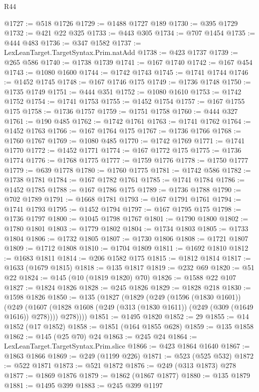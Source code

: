 \begin{lexlean}{R44}
\begin{coremodule}
@1727 := @518 @1726
@1729 := @1488 @1727 @189
@1730 := @395 @1729
@1732 := @421 @22 @325
@1733 := @443 @305
@1734 := @707 @1454
@1735 := @444 @483
@1736 := @347 @1582
@1737 := LexLeanTarget.TargetSyntax.Prim.natAdd
@1738 := @423 @1737
@1739 := @265 @586
@1740 := @1738 @1739
@1741 := @167 @1740
@1742 := @167 @454
@1743 := @1080 @1600
@1744 := @1742 @1743
@1745 := @1741 @1744
@1746 := @1452 @1745
@1748 := @167 @1746 @175
@1749 := @1736 @1748
@1750 := @1735 @1749
@1751 := @444 @351
@1752 := @1080 @1610
@1753 := @1742 @1752
@1754 := @1741 @1753
@1755 := @1452 @1754
@1757 := @167 @1755 @175
@1758 := @1736 @1757
@1759 := @1751 @1758
@1760 := @444 @327
@1761 := @190 @485
@1762 := @1742 @1761
@1763 := @1741 @1762
@1764 := @1452 @1763
@1766 := @167 @1764 @175
@1767 := @1736 @1766
@1768 := @1760 @1767
@1769 := @1080 @485
@1770 := @1742 @1769
@1771 := @1741 @1770
@1772 := @1452 @1771
@1774 := @167 @1772 @175
@1775 := @1736 @1774
@1776 := @1768 @1775
@1777 := @1759 @1776
@1778 := @1750 @1777
@1779 := @639 @1778
@1780 := @1760 @1775
@1781 := @1742 @586
@1782 := @1738 @1781
@1784 := @167 @1782 @1761
@1785 := @1741 @1784
@1786 := @1452 @1785
@1788 := @167 @1786 @175
@1789 := @1736 @1788
@1790 := @702 @1789
@1791 := @1668 @1781
@1793 := @167 @1791 @1761
@1794 := @1741 @1793
@1795 := @1452 @1794
@1797 := @167 @1795 @175
@1798 := @1736 @1797
@1800 := @1045 @1798 @1767
@1801 := @1790 @1800
@1802 := @1780 @1801
@1803 := @1779 @1802
@1804 := @1734 @1803
@1805 := @1733 @1804
@1806 := @1732 @1805
@1807 := @1730 @1806
@1808 := @1721 @1807
@1809 := @1712 @1808
@1810 := @1704 @1809
@1811 := @1692 @1810
@1812 := @1683 @1811
@1814 := @206 @1582 @175
@1815 := @1812 @1814
@1817 := @1633 (@1679 @1815)
@1818 := @135 @1817
@1819 := @232 @69
@1820 := @51 @22
@1824 := @145 (@10 (@1819 @1820) @70)
@1826 := @1588 @22 @107
@1827 := @1824 @1826
@1828 := @245 @1826
@1829 := @1828 @218
@1830 := @1598 @1826
@1850 := @135
    (@1827
      (@1829
        (@249
          (@1596 (@1830 @1601))
          (@249
            (@1607 (@1828 @1608 (@249 (@313 (@1830 @1611)) (@249 (@309 (@1649 @1616)) @278))))
            @278))))
@1851 := @1495 @1820
@1852 := 29
@1855 := @14 @1852 (@17 @1852)
@1858 := @1851 (@164 @1855 @628)
@1859 := @135 @1858
@1862 := @145 (@25 @70) @24
@1863 := @245 @24
@1864 := LexLeanTarget.TargetSyntax.Prim.slice
@1866 := @423 @1864 @1640
@1867 := @1863 @1866
@1869 := @249 (@1199 @226)
@1871 := @523 (@525 @532)
@1872 := @522 @1871
@1873 := @521 @1872
@1876 := @249 (@313 @1873) @278
@1877 := @1869 @1876
@1879 := @1862 (@1867 @1877)
@1880 := @135 @1879
@1881 := @1495 @399
@1883 := @245 @399 @1197

\end{coremodule}
\end{lexlean}
